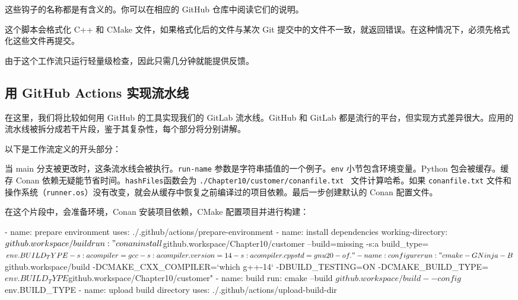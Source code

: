 \label{idx:961}
这些钩子的名称都是有含义的。你可以在相应的 GitHub 仓库中阅读它们的说明。

这个脚本会格式化 C++ 和 CMake 文件，如果格式化后的文件与某次 Git 提交中的文件不一致，就返回错误。在这种情况下，必须先格式化这些文件再提交。

由于这个工作流只运行轻量级检查，因此只需几分钟就能提供反馈。

\subsection{用 GitHub Actions 实现流水线}

\label{idx:962}
在这里，我们将比较如何用 GitHub 的工具实现我们的 GitLab 流水线。GitHub 和 GitLab 都是流行的平台，但实现方式差异很大。应用的流水线被拆分成若干片段，鉴于其复杂性，每个部分将分别讲解。

以下是工作流定义的开头部分：


\label{idx:963}
当 main 分支被更改时，这条流水线会被执行。\texttt{run-name} 参数是字符串插值的一个例子。\texttt{env} 小节包含环境变量。Python 包会被缓存。缓存 Conan 依赖无疑能节省时间。\texttt{hashFiles}函数会为 \texttt{.\allowbreak{}/\allowbreak{}Chapter10/\allowbreak{}customer/\allowbreak{}conanfile.\allowbreak{}txt } 文件计算哈希。如果 \texttt{conanfile.\allowbreak{}txt} 文件和操作系统（\texttt{runner.os}）没有改变，就会从缓存中恢复之前编译过的项目依赖。最后一步创建默认的 Conan 配置文件。

在这个片段中，会准备环境，Conan 安装项目依赖，CMake 配置项目并进行构建：

\begin{codebox}[yaml]
      - name: prepare environment
        uses: ./.github/actions/prepare-environment
      - name: install dependencies
        working-directory: ${{github.workspace}}/build
        run: "conan install ${{github.workspace}}/Chapter10/customer --build=missing -s:a build_type=${{env.BUILD_TYPE}}
        -s:a compiler=gcc -s:a compiler.version=14 -s:a compiler.cppstd=gnu20 -of ."
      - name: configure
        run: "cmake -GNinja -B ${{github.workspace}}/build -DCMAKE_CXX_COMPILER=`which g++-14` -DBUILD_TESTING=ON
        -DCMAKE_BUILD_TYPE=${{env.BUILD_TYPE}} ${{github.workspace}}/Chapter10/customer"
      - name: build
        run: cmake --build ${{github.workspace}}/build --config ${{env.BUILD_TYPE}}
      - name: upload build directory
        uses: ./.github/actions/upload-build-dir
\end{codebox}

